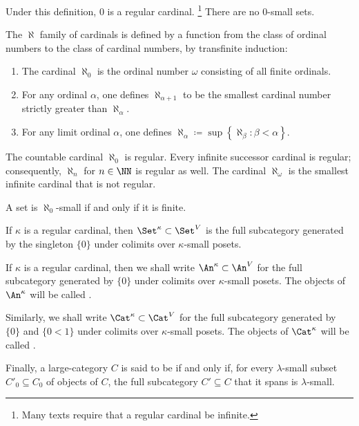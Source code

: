 \begin{eg}
	Under this definition, $ 0 $ is a regular cardinal.%
	\footnote{Many texts require that a regular cardinal be infinite.}
	There are no $ 0 $-small sets.
\end{eg}

\begin{eg}
	The $ \aleph $ family of cardinals is defined by
	a function from the class of ordinal numbers
	to the class of cardinal numbers, by transfinite induction:
	\begin{enumerate}
		\item The cardinal $ \aleph_0 $ is the ordinal number
			$ \omega $ consisting of all finite ordinals.
		\item For any ordinal $ \alpha $,
			one defines $ \aleph_{\alpha + 1} $ to be
			the smallest cardinal number strictly greater than $ \aleph_{\alpha} $.
		\item For any limit ordinal $ \alpha $,
			one defines $ \aleph_{\alpha} \coloneq \sup \left\{ \aleph_{\beta} : \beta < \alpha \right\} $.
	\end{enumerate}

	The countable cardinal $ \aleph_0 $ is regular.
	Every infinite successor cardinal is regular;
	consequently, $ \aleph_n $ for $ n \in \NN $ is regular as well.
	The cardinal $ \aleph_{\omega} $ is
	the smallest infinite cardinal that is not regular.
\end{eg}

\begin{eg}
	A set is $ \aleph_0 $-small if and only if it is finite.
\end{eg}

\begin{nul}
	If $ \kappa $ is a regular cardinal,
	then $ \Set^{\kappa} \subset \Set^V $ is the full subcategory
	generated by the singleton $ \{ 0 \}$
	under colimits over $ \kappa $-small posets.
\end{nul}

\begin{definition}
	If $ \kappa $ is a regular cardinal,
	then we shall write $ \An^{\kappa} \subset \An^V $
	for the full subcategory generated by $ \{ 0 \} $
	under colimits over $ \kappa $-small posets.
	The objects of $ \An^{\kappa} $ will be called
	.

	Similarly, we shall write $ \Cat^{\kappa} \subset \Cat^V $
	for the full subcategory generated 
	by $ \{ 0 \} $ and $ \{ 0 < 1 \} $
	under colimits over $ \kappa $-small posets.
	The objects of $ \Cat^{\kappa} $ will be called
	.

	Finally, a large-category $ C $
	is said to be 
	if and only if,
	for every $ \lambda $-small subset $ C'_0 \subseteq C_0 $
	of objects of $ C $, the full subcategory $ C' \subseteq C $
	that it spans is $ \lambda $-small.
\end{definition}

